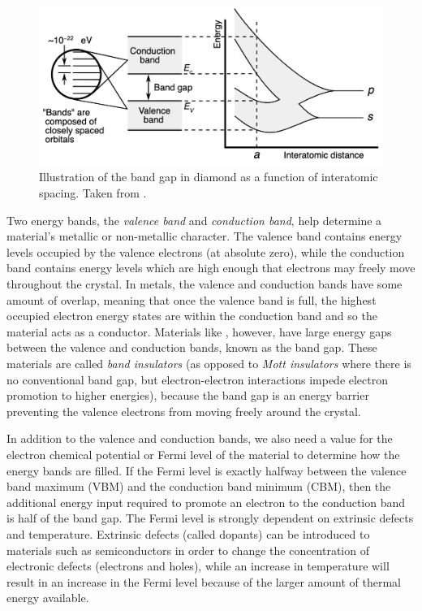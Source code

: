 \begin{figure}[ht]
\centering
\includegraphics[width=\linewidth]{images/band_gap.png}
\caption[Illustration of the band gap in diamond as a function of interatomic spacing.]{Illustration of the band gap in diamond as a function of interatomic spacing. Taken from \cite{Chetvorno2017}.}
\label{figure:band_gap}
\end{figure}

Two energy bands, the \emph{valence band} and \emph{conduction band}, help determine a material's metallic or non-metallic character. The valence band contains energy levels occupied by the valence electrons (at absolute zero), while the conduction band contains energy levels which are high enough that electrons may freely move throughout the crystal. In metals, the valence and conduction bands have some amount of overlap, meaning that once the valence band is full, the highest occupied electron energy states are within the conduction band and so the material acts as a conductor. Materials like \zirconia , however, have large energy gaps between the valence and conduction bands, known as the band gap. These materials are called \emph{band insulators} (as opposed to \emph{Mott insulators} where there is no conventional band gap, but electron-electron interactions impede electron promotion to higher energies), because the band gap is an energy barrier preventing the valence electrons from moving freely around the crystal. 

In addition to the valence and conduction bands, we also need a value for the electron chemical potential or Fermi level of the material to determine how the energy bands are filled. If the Fermi level is exactly halfway between the valence band maximum (VBM) and the conduction band minimum (CBM), then the additional energy input required to promote an electron to the conduction band is half of the band gap. The Fermi level is strongly dependent on extrinsic defects and temperature. Extrinsic defects (called dopants) can be introduced to materials such as semiconductors in order to change the concentration of electronic defects (electrons and holes), while an increase in temperature will result in an increase in the Fermi level because of the larger amount of thermal energy available.

